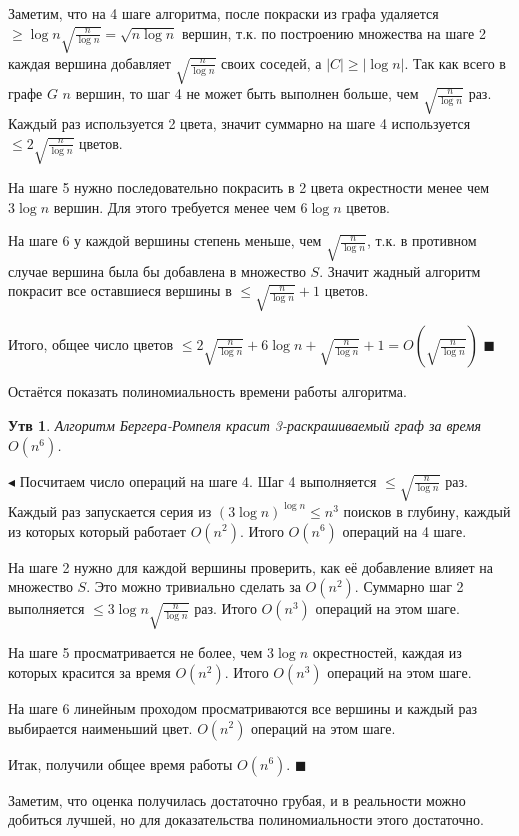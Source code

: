 \documentclass{article}
\newtheorem*{statement}{Утв}
\begin{document}
Заметим, что на 4 шаге алгоритма, после покраски из графа удаляется $\ge \log{n}\sqrt{\frac{n}{\log{n}}}=\sqrt{n\log{n}}$ вершин, т.к. по построению множества на шаге 2 каждая вершина добавляет $\sqrt{\frac{n}{\log{n}}}$ своих соседей, а $|C| \ge |\log{n}|$. Так как всего в графе $G$ $n$ вершин, то шаг 4 не может быть выполнен больше, чем $\sqrt{\frac{n}{\log{n}}}$ раз. Каждый раз используется 2 цвета, значит суммарно на шаге 4 используется $\le 2\sqrt{\frac{n}{\log{n}}}$ цветов.

На шаге 5 нужно последовательно покрасить в 2 цвета окрестности менее чем $3\log{n}$ вершин. Для этого требуется менее чем $6\log{n}$ цветов.

На шаге 6 у каждой вершины степень меньше, чем $\sqrt{\frac{n}{\log{n}}}$, т.к. в противном случае вершина была бы добавлена в множество $S$. Значит жадный алгоритм покрасит все оставшиеся вершины в $\le\sqrt{\frac{n}{\log{n}}} + 1$ цветов.

Итого, общее число цветов $\le 2\sqrt{\frac{n}{\log{n}}} + 6\log{n} + \sqrt{\frac{n}{\log{n}}} + 1 = O(\sqrt{\frac{n}{\log{n}}})$
$\blacksquare$

Остаётся показать полиномиальность времени работы алгоритма.

\begin{statement}
Алгоритм Бергера-Ромпеля красит 3-раскрашиваемый граф за время $O(n^6)$.
\end{statement}
$\blacktriangleleft$
Посчитаем число операций на шаге 4. Шаг 4 выполняется $\le \sqrt{\frac{n}{\log{n}}}$ раз. Каждый раз запускается серия из $(3\log{n})^{\log{n}} \le n^3$ поисков в глубину, каждый из которых который работает $O(n^2)$. Итого $O(n^6)$ операций на 4 шаге.

На шаге 2 нужно для каждой вершины проверить, как её добавление влияет на множество $S$. Это можно тривиально сделать за $O(n^2)$. Суммарно шаг 2 выполняется $\le 3\log{n}\sqrt{\frac{n}{\log{n}}}$ раз. Итого $O(n^3)$ операций на этом шаге.

На шаге 5 просматривается не более, чем $3\log{n}$ окрестностей, каждая из которых красится за время $O(n^2)$. Итого $O(n^3)$ операций на этом шаге.

На шаге 6 линейным проходом просматриваются все вершины и каждый раз выбирается наименьший цвет. $O(n^2)$ операций на этом шаге.

Итак, получили общее время работы $O(n^6)$.
$\blacksquare$

\bigskip

Заметим, что оценка получилась достаточно грубая, и в реальности можно добиться лучшей, но для доказательства полиномиальности этого достаточно.
\end{document}
